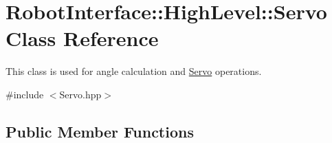 \hypertarget{classRobotInterface_1_1HighLevel_1_1Servo}{}\section{Robot\+Interface\+:\+:High\+Level\+:\+:Servo Class Reference}
\label{classRobotInterface_1_1HighLevel_1_1Servo}


This class is used for angle calculation and \hyperlink{classRobotInterface_1_1HighLevel_1_1Servo}{Servo} operations.  




{\ttfamily \#include $<$Servo.\+hpp$>$}

\subsection*{Public Member Functions}
